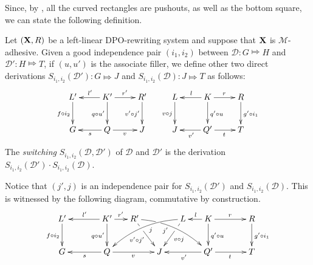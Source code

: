 \documentclass[a4paper,UKenglish,cleveref,pdftex, thm-restate,numberwithinsect]{lipics}
\def\X{\textbf {\textup{X}}}
\newcommand{\dder}[1]{\mathscr{#1}}
\newcommand{\sder}[2]{S_{i_1,i_2}(\mathscr{#1}, \mathscr{#2})}
\begin{document}
	Since, by , all the curved rectangles are pushouts, as well as the bottom square, we can state the following definition.
\begin{definition}\label{def:switch}
	Let $(\X,R)$ be a left-linear DPO-rewriting system and suppose that $\X$ is $\mathcal{M}$-adhesive. Given a good independence pair $(i_1, i_2)$ between $\dder{D}\colon G\Mapsto H$ and $\dder{D}'\colon H\Mapsto T$, if $(u,u')$ is the associate filler, we define other two direct derivations $S_{i_1,i_2}(\dder{D}')\colon G\Mapsto J$ and $S_{i_1,i_2}(\dder{D})\colon J\Mapsto T$ as follows:
		\[\xymatrix{L' \ar[d]_{f\circ i_2}& \ar[l]_{l'}K'\ar[d]_{q\circ u'} \ar[r]^{r'} & R' \ar[d]_{v'\circ j'} & L \ar[d]_{v\circ j} & \ar[l]_{l}K \ar[d]^{q'\circ u}\ar[r]^{r}& R \ar[d]^{g'\circ i_1}\\
		G &\ar[l]^{s} Q \ar[r]_{v}& J&J & \ar[l]^{v'}Q' \ar[r]_{t} & T}\]
	The \emph{switching} $\sder{D}{D'}$ of $\dder{D}$ and $\dder{D'}$ is the derivation $S_{i_1,i_2}(\dder{D}')\cdot S_{i_1,i_2}(\dder{D})$.
\end{definition}

\begin{remark}\label{rem:indip}Notice that $(j', j)$ is an independence pair for $S_{i_1,i_2}(\dder{D}')$ and $S_{i_1,i_2}(\dder{D})$. This is witnessed by the following diagram, commutative by construction.
	\[\xymatrix@C=15pt{L' \ar[d]_{f\circ i_2}&& K' \ar[d]_{q\circ u'}\ar[ll]_{l'} \ar[r]^{r'} & R' \ar@/^.35cm/[drrr]_(.4){j'}|(.285)\hole \ar[dr]|(.28)\hole_{v'\circ j'} && L \ar@/_.35cm/[dlll]^(.4){j} \ar[dl]|(.28)\hole^{v\circ j}& K \ar[d]^{q'\circ u}\ar[l]_{l} \ar[rr]^{r} && R \ar[d]^{g'\circ i_1}\\G && \ar[ll]^{s} Q \ar[rr]_{v}&& J  && \ar[ll]^{v'} Q' \ar[rr]_{t}&& T}\]
\end{remark} 
 
\end{document}
